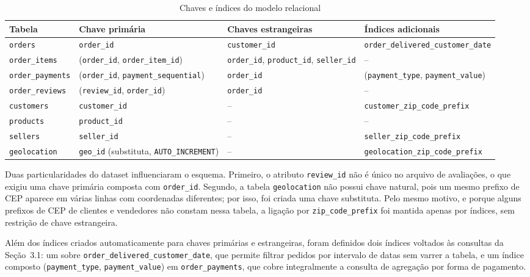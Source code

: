 \documentclass[12pt]{article}
\newcommand{\cod}[1]{\texttt{#1}}
\begin{document}
\begin{table}[htbp]
\centering
\caption{Chaves e índices do modelo relacional}
\label{tab:mysql}
\footnotesize
\begin{tabularx}{\textwidth}{|>{\raggedright\arraybackslash}p{2.4cm}|L|L|L|}
\hline
\textbf{Tabela} & \textbf{Chave primária} & \textbf{Chaves estrangeiras} & \textbf{Índices adicionais} \\ \hline
\cod{orders} & \cod{order\_id} & \cod{customer\_id} & \cod{order\_delivered\_\allowbreak customer\_date} \\ \hline
\cod{order\_items} & (\cod{order\_id}, \cod{order\_item\_id}) & \cod{order\_id}, \cod{product\_id}, \cod{seller\_id} & -- \\ \hline
\cod{order\_\allowbreak payments} & (\cod{order\_id}, \cod{payment\_\allowbreak sequential}) & \cod{order\_id} & (\cod{payment\_type}, \cod{payment\_value}) \\ \hline
\cod{order\_\allowbreak reviews} & (\cod{review\_id}, \cod{order\_id}) & \cod{order\_id} & -- \\ \hline
\cod{customers} & \cod{customer\_id} & -- & \cod{customer\_zip\_\allowbreak code\_prefix} \\ \hline
\cod{products} & \cod{product\_id} & -- & -- \\ \hline
\cod{sellers} & \cod{seller\_id} & -- & \cod{seller\_zip\_\allowbreak code\_prefix} \\ \hline
\cod{geolocation} & \cod{geo\_id} (substituta, \cod{AUTO\_\allowbreak INCREMENT}) & -- & \cod{geolocation\_\allowbreak zip\_code\_prefix} \\ \hline
\end{tabularx}
\end{table}
 
Duas particularidades do dataset influenciaram o esquema. Primeiro, o
atributo \texttt{review\_id} não é único no arquivo de avaliações, o que
exigiu uma chave primária composta com \texttt{order\_id}. Segundo, a tabela
\texttt{geolocation} não possui chave natural, pois um mesmo prefixo de CEP
aparece em várias linhas com coordenadas diferentes; por isso, foi criada
uma chave substituta. Pelo mesmo motivo, e porque alguns prefixos de CEP de
clientes e vendedores não constam nessa tabela, a ligação por
\texttt{zip\_code\_prefix} foi mantida apenas por índices, sem restrição de
chave estrangeira.
 
Além dos índices criados automaticamente para chaves primárias e
estrangeiras, foram definidos dois índices voltados às consultas da
Seção~3.1: um sobre \texttt{order\_delivered\_customer\_date}, que permite
filtrar pedidos por intervalo de datas sem varrer a tabela, e um índice
composto (\texttt{payment\_type}, \texttt{payment\_value}) em
\texttt{order\_payments}, que cobre integralmente a consulta de agregação por
forma de pagamento.
 
\end{document}
